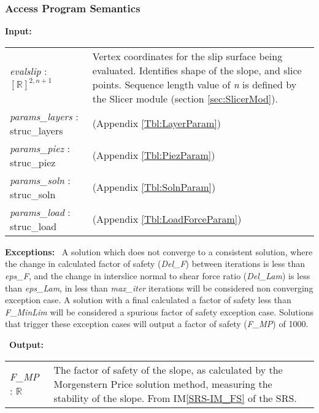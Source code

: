 \documentclass[12pt, titlepage]{article}
\begin{document}
\subsubsection{Access Program Semantics}

\textbf{Input:} 
\renewcommand*{\arraystretch}{1.5}
\begin{longtable}{p{} p{}}
  \textit{evalslip} : $[\mathbb{R}]^{2,n+1}$ & Vertex coordinates for
  the slip surface being evaluated. Identifies shape of the slope, and
  slice points. Sequence length value of \textit{n} is defined by the
  Slicer module (section \ref{sec:SlicerMod}).\\

  \textit{params\_layers} : struc\_layers & (Appendix
  \ref{Tbl:LayerParam})\\

  \textit{params\_piez} : struc\_piez & (Appendix
  \ref{Tbl:PiezParam})\\

  \textit{params\_soln} : struc\_soln & (Appendix
  \ref{Tbl:SolnParam})\\

  \textit{params\_load} : struc\_load & (Appendix
  \ref{Tbl:LoadForceParam})
\end{longtable}

\noindent \textbf{Exceptions:} ~\newline\noindent A solution which
does not converge to a consistent solution, where the change in
calculated factor of safety (\textit{Del\_F}) between iterations is
less than \textit{eps\_F}, and the change in interslice normal to
shear force ratio (\textit{Del\_Lam}) is less than \textit{eps\_Lam},
in less than \textit{max\_iter} iterations will be considered non
converging exception case. A solution with a final calculated a factor
of safety less than \textit{F\_MinLim} will be considered a spurious
factor of safety exception case. Solutions that trigger these
exception cases will output a factor of safety (\textit{F\_MP}) of
1000.

~\newline\noindent \textbf{Output:}
\renewcommand*{\arraystretch}{1.5}
\begin{longtable}{p{} p{}}
  \textit{F\_MP} : $\mathbb{R}$ & The factor of safety of the slope,
  as calculated by the Morgenstern Price solution method, measuring
  the stability of the slope. From IM\ref{SRS-IM_FS} of the SRS.\\
\end{longtable}
\end{document}
